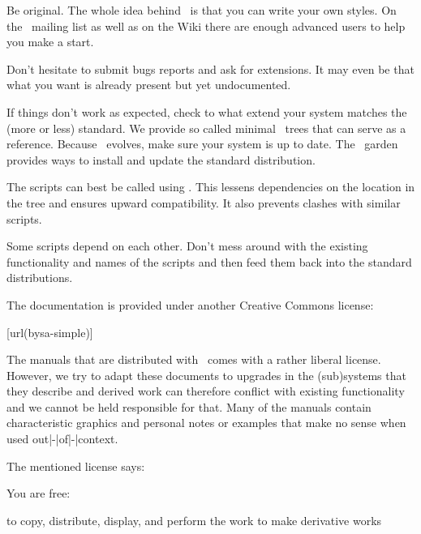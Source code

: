 \startitem
    Be original. The whole idea behind \CONTEXT\ is that you can write your own
    styles. On the \CONTEXT\ mailing list as well as on the Wiki there are enough
    advanced users to help you make a start.
\stopitem

\startitem
    Don't hesitate to submit bugs reports and ask for extensions. It may even be
    that what you want is already present but yet undocumented.
\stopitem

\startitem
    If things don't work as expected, check to what extend your system matches
    the (more or less) standard. We provide so called minimal \CONTEXT\ trees
    that can serve as a reference. Because \CONTEXT\ evolves, make sure your
    system is up to date. The \CONTEXT\ garden provides ways to install and
    update the standard distribution.
\stopitem

\startitem
    The scripts can best be called using . This lessens dependencies
    on the location in the tree and ensures upward compatibility. It also prevents
    clashes with similar scripts.
\stopitem

\startitem
    Some scripts depend on each other. Don't mess around with the existing
    functionality and names of the scripts and then feed them back into the
    standard distributions.
\stopitem

\stopitemize

\stopsubject

\startsubject[title={Documents}]

The documentation is provided under another Creative Commons license:

\startnarrower
    [url(bysa-simple)]
\stopnarrower

The manuals that are distributed with \CONTEXT\ comes with a rather liberal
license. However, we try to adapt these documents to upgrades in the (sub)systems
that they describe and derived work can therefore conflict with existing
functionality and we cannot be held responsible for that. Many of the manuals
contain characteristic graphics and personal notes or examples that make no sense
when used out|-|of|-|context.

The mentioned license says:

\startcolor[blue]
You are free:

\startitemize
    \startitem to copy, distribute, display, and perform the work \stopitem
    \startitem to make derivative works \stopitem
\stopitemize

